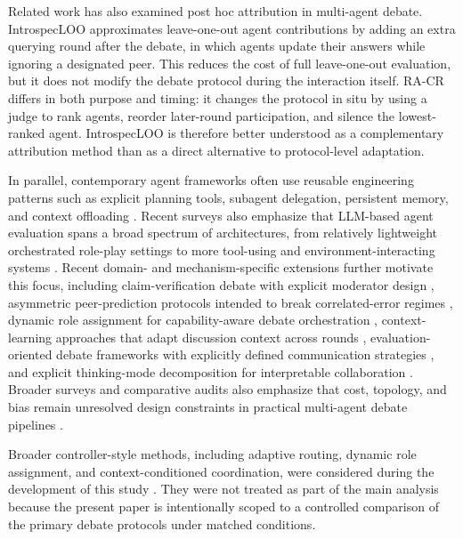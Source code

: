 \documentclass[11pt]{article}
\begin{document}
Related work has also examined post hoc attribution in multi-agent debate. IntrospecLOO \citep{cui2025introspecloo} approximates leave-one-out agent contributions by adding an extra querying round after the debate, in which agents update their answers while ignoring a designated peer. This reduces the cost of full leave-one-out evaluation, but it does not modify the debate protocol during the interaction itself. RA-CR differs in both purpose and timing: it changes the protocol in situ by using a judge to rank agents, reorder later-round participation, and silence the lowest-ranked agent. IntrospecLOO is therefore better understood as a complementary attribution method than as a direct alternative to protocol-level adaptation.

In parallel, contemporary agent frameworks often use reusable engineering patterns such as explicit planning tools, subagent delegation, persistent memory, and context offloading \citep{langchainmultiagent2026}. Recent surveys also emphasize that LLM-based agent evaluation spans a broad spectrum of architectures, from relatively lightweight orchestrated role-play settings to more tool-using and environment-interacting systems \citep{yehudai2025survey}. Recent domain- and mechanism-specific extensions further motivate this focus, including claim-verification debate with explicit moderator design \citep{he2026debatecv}, asymmetric peer-prediction protocols intended to break correlated-error regimes \citep{liu2026acemad}, dynamic role assignment for capability-aware debate orchestration \citep{zhang2026dynamic}, context-learning approaches that adapt discussion context across rounds \citep{hua2026context}, evaluation-oriented debate frameworks with explicitly defined communication strategies \citep{chan2023chateval}, and explicit thinking-mode decomposition for interpretable collaboration \citep{hefeng2026dimo}. Broader surveys and comparative audits also emphasize that cost, topology, and bias remain unresolved design constraints in practical multi-agent debate pipelines \citep{smit2024mad,tillmann2025review}.

Broader controller-style methods, including adaptive routing, dynamic role assignment, and context-conditioned coordination, were considered during the development of this study \citep{yehudai2025survey,liu2024dylan,zhang2026dynamic,hua2026context}. They were not treated as part of the main analysis because the present paper is intentionally scoped to a controlled comparison of the primary debate protocols under matched conditions.
\end{document}
